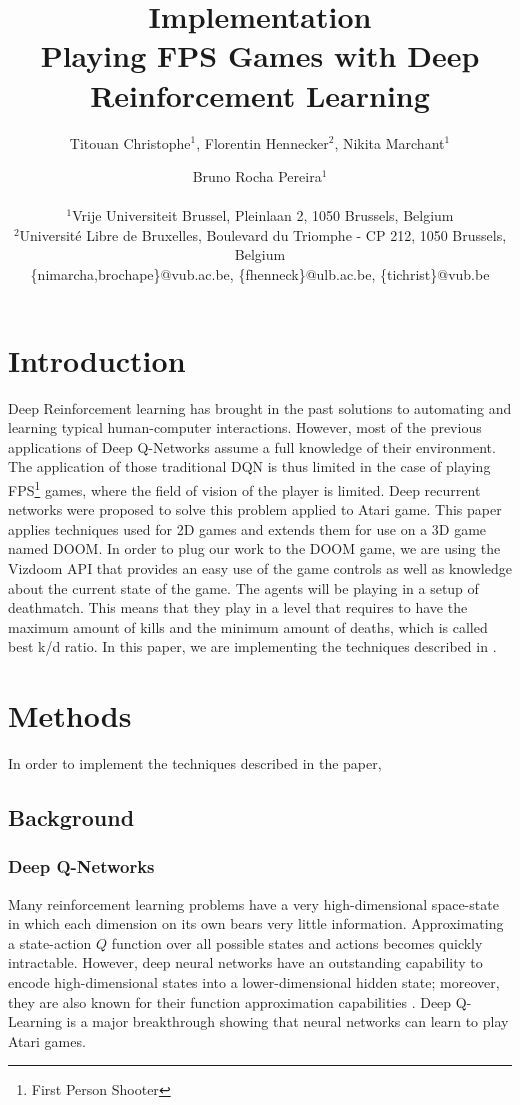 \documentclass[letterpaper]{article}
\title{Implementation\\Playing FPS Games with Deep Reinforcement Learning}
\author{Titouan Christophe$^{1}$, Florentin Hennecker$^{2}$, Nikita Marchant$^{1}$ \and Bruno Rocha Pereira$^{1}$ \\
\mbox{}\\
$^1$Vrije Universiteit Brussel, Pleinlaan 2, 1050 Brussels, Belgium \\
$^2$Universit\'e Libre de Bruxelles, Boulevard du Triomphe - CP 212, 1050
Brussels, Belgium \\
\{nimarcha,brochape\}@vub.ac.be, \{fhenneck\}@ulb.ac.be, \{tichrist\}@vub.be}
\begin{document}
\maketitle

\begin{abstract}
\end{abstract}

\section{Introduction}
Deep Reinforcement learning has brought in the past solutions to automating and
learning typical human-computer interactions. 
However, most of the previous applications of Deep Q-Networks assume a full
knowledge of their environment. The application of those traditional DQN is
thus limited in the case of playing FPS\footnote{First Person Shooter} games,
where the field of vision of the player is limited. Deep recurrent networks
were proposed to solve this problem \citep{Hausknecht2015} applied to Atari
game. This paper applies techniques used for 2D games and extends them for use
on a 3D game named DOOM.
In order to plug our work to the DOOM game, we are using the Vizdoom API
\citep{Kempka2016} that provides an easy use of the game controls as well as
knowledge about the current state of the game.
The agents will be playing in a setup of deathmatch. This means that they play
in a level that requires to have the maximum amount of kills and the minimum
amount of deaths, which is called best k/d ratio.
In this paper, we are implementing the techniques described in
\citep{Lample2016}.

\section{Methods}
In order to implement the techniques described in the paper,

\subsection{Background}
\subsubsection{Deep Q-Networks}
Many reinforcement learning problems have a very high-dimensional space-state
in which each dimension on its own bears very little information. Approximating
a state-action $Q$ function over all possible states and actions becomes quickly
intractable. However, deep neural networks have an outstanding capability to
encode high-dimensional states into a lower-dimensional hidden state; moreover,
they are also known for their function approximation capabilities
\citep{Hornik1991}. Deep Q-Learning \citep{Mnih2015} is a major breakthrough
showing that neural networks can learn to play Atari games.
\end{document}

